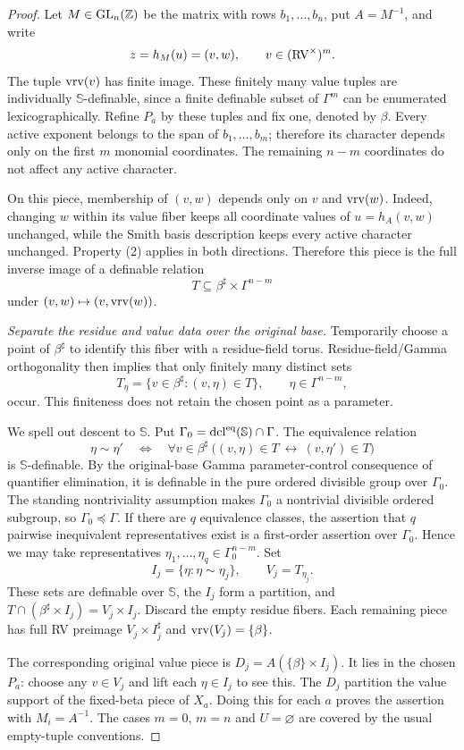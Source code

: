 \begin{proof}
Let $M\in\operatorname{GL}_n(\mathbb Z)$ be the matrix with rows $b_1,\ldots,b_n$,
put $A=M^{-1}$, and write
\[
 z=h_M(u)=(v,w),\qquad v\in(\mathrm{RV}^\times)^m.
\]
The tuple $\operatorname{vrv}(v)$ has finite image. These finitely many value tuples
are individually $\mathbb S$-definable, since a finite definable subset
of $\Gamma^m$ can be enumerated lexicographically. Refine $P_a$ by
these tuples and fix one, denoted by $\beta$.
Every active exponent belongs to the span of $b_1,\ldots,b_m$;
therefore its character depends only on the first $m$ monomial
coordinates. The remaining $n-m$ coordinates do not affect any active
character.

On this piece, membership of $(v,w)$ depends only on $v$ and
$\operatorname{vrv}(w)$. Indeed, changing $w$ within its value fiber keeps all
coordinate values of $u=h_A(v,w)$ unchanged, while the Smith basis description
keeps every active character unchanged. Property (2) applies in
both directions. Therefore this piece is the full inverse image
of a definable relation
\[
 T\subseteq\beta^\sharp\times\Gamma^{n-m}
\]
under $(v,w)\mapsto(v,\operatorname{vrv}(w))$.

\emph{Separate the residue and value data over the original base.}
Temporarily choose a point of $\beta^\sharp$ to identify this
fiber with a residue-field torus. Residue-field/Gamma
orthogonality then implies that only finitely many distinct sets
\[
 T_\eta=\{v\in\beta^\sharp:(v,\eta)\in T\},
 \qquad \eta\in\Gamma^{n-m},
\]
occur. This finiteness does not retain the chosen point as a
parameter.

We spell out descent to $\mathbb S$. Put
$\Gamma_0=\operatorname{dcl}^{\mathrm{eq}}(\mathbb S)\cap\Gamma$.
The equivalence relation
\[
 \eta\sim\eta' \quad\Longleftrightarrow\quad
 \forall v\in\beta^\sharp\
 \big((v,\eta)\in T\ \longleftrightarrow\ (v,\eta')\in T\big)
\]
is $\mathbb S$-definable. By the original-base Gamma
parameter-control consequence of quantifier elimination, it is
definable in the pure ordered divisible group over $\Gamma_0$.
The standing nontriviality assumption makes $\Gamma_0$ a
nontrivial divisible ordered subgroup, so
$\Gamma_0\preceq\Gamma$. If there are $q$ equivalence classes,
the assertion that $q$ pairwise inequivalent representatives
exist is a first-order assertion over $\Gamma_0$. Hence we may
take representatives $\eta_1,\ldots,\eta_q\in\Gamma_0^{n-m}$.
Set
\[
 I_j=\{\eta:\eta\sim\eta_j\},\qquad V_j=T_{\eta_j}.
\]
These sets are definable over $\mathbb S$, the $I_j$ form a
partition, and
$T\cap(\beta^\sharp\times I_j)=V_j\times I_j$.
Discard the empty residue fibers. Each remaining piece has
full RV preimage $V_j\times I_j^\sharp$ and
$\operatorname{vrv}(V_j)=\{\beta\}$.

The corresponding original value piece is
$D_j=A(\{\beta\}\times I_j)$. It lies in the chosen $P_a$:
choose any $v\in V_j$ and lift each $\eta\in I_j$ to see this.
The $D_j$ partition the value support of the fixed-beta piece
of $X_a$.
Doing this for each $a$ proves the assertion with
$M_i=A^{-1}$. The cases $m=0$, $m=n$ and $U=\varnothing$
are covered by the usual empty-tuple conventions.
\end{proof}
